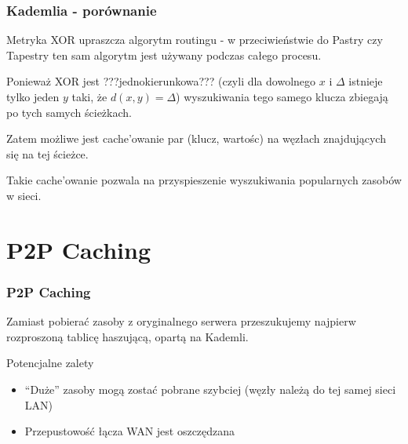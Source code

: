 \documentclass{beamer}
\begin{document}
\begin{frame}
\frametitle{Kademlia - porównanie}

\begin{block}{}
Metryka XOR upraszcza algorytm routingu - w przeciwieństwie do Pastry czy Tapestry ten sam algorytm jest używany podczas całego procesu.
\end{block}

\pause

\begin{block}{}
Ponieważ XOR jest ???jednokierunkowa??? (czyli dla dowolnego $x$ i $\Delta$ istnieje tylko jeden $y$ taki, że $d(x, y) = \Delta$) wyszukiwania tego samego klucza zbiegają po tych samych ścieżkach.

Zatem możliwe jest cache'owanie par (klucz, wartośc) na węzłach znajdujących się na tej ścieżce.
 
\end{block}

\pause

\begin{block}{}
Takie cache'owanie pozwala na przyspieszenie wyszukiwania popularnych zasobów w sieci.
\end{block}

\end{frame}

\section{P2P Caching}
\begin{frame}
\frametitle{P2P Caching}

\begin{block}{}
Zamiast pobierać zasoby z oryginalnego serwera przeszukujemy najpierw rozproszoną tablicę haszującą, opartą na Kademli.
\end{block}

\begin{block}{Potencjalne zalety}
\begin{itemize}
  \item ``Duże'' zasoby mogą zostać pobrane szybciej (węzły należą do tej samej sieci LAN)
  \item Przepustowość łącza WAN jest oszczędzana
\end{itemize}
\end{block}

\end{frame}
\end{document}
